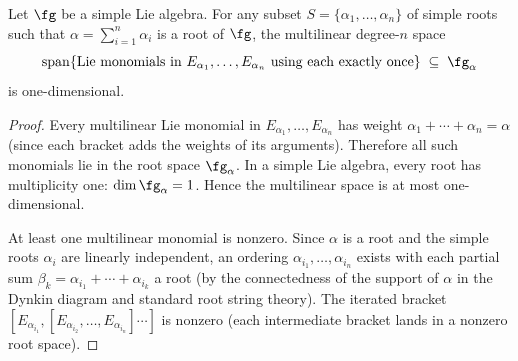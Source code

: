 \begin{theorem}
\label{thm:root-space-one-dim}
Let $\fg$ be a simple Lie algebra. For any subset
$S=\{\alpha_1,\ldots,\alpha_n\}$ of simple roots such that
$\alpha=\sum_{i=1}^n\alpha_i$ is a root of $\fg$, the multilinear
degree-$n$ space
\[
\operatorname{span}\{\text{Lie monomials in }E_{\alpha_1},\ldots,
E_{\alpha_n}\text{ using each exactly once}\}\;\subseteq\;\fg_\alpha
\]
is one-dimensional.
\end{theorem}

\begin{proof}
Every multilinear Lie monomial in $E_{\alpha_1},\ldots,E_{\alpha_n}$
has weight $\alpha_1+\cdots+\alpha_n=\alpha$ (since each bracket
adds the weights of its arguments). Therefore all such monomials
lie in the root space $\fg_\alpha$. In a simple Lie algebra, every
root has multiplicity one: $\dim\fg_\alpha=1$. Hence the
multilinear space is at most one-dimensional.

At least one multilinear monomial is nonzero. Since $\alpha$ is a root
and the simple roots $\alpha_i$ are linearly independent, an ordering
$\alpha_{i_1},\ldots,\alpha_{i_n}$ exists with each partial sum
$\beta_k=\alpha_{i_1}+\cdots+\alpha_{i_k}$ a root (by the connectedness
of the support of $\alpha$ in the Dynkin diagram and standard root
string theory). The iterated bracket
$[E_{\alpha_{i_1}},[E_{\alpha_{i_2}},\ldots,E_{\alpha_{i_n}}]\cdots]$
is nonzero (each intermediate bracket lands in a nonzero root space).
\end{proof}

